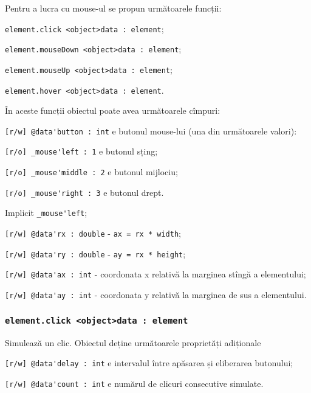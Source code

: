 Pentru a lucra cu mouse-ul se propun următoarele funcții:
\begin{icItems}
	\item \lstinline|element.click <object>data : element|;
	\item \lstinline|element.mouseDown <object>data : element|;
	\item \lstinline|element.mouseUp <object>data : element|;
	\item \lstinline|element.hover <object>data : element|.
\end{icItems}

În aceste funcții obiectul  poate avea următoarele cîmpuri:
\begin{icItems}
	\item \lstinline|[r/w] @data'button : int| e butonul mouse-lui (una din următoarele valori):
	\begin{icItems}
		\item \lstinline|[r/o] _mouse'left : 1| e butonul sțing;
		\item \lstinline|[r/o] _mouse'middle : 2| e butonul mijlociu;
		\item \lstinline|[r/o] _mouse'right : 3| e butonul drept.
	\end{icItems}
	Implicit \lstinline|_mouse'left|;
	\item \lstinline|[r/w] @data'rx : double| - \lstinline|ax = rx * width|;
	\item \lstinline|[r/w] @data'ry : double| - \lstinline|ay = rx * height|;
	\item \lstinline|[r/w] @data'ax : int| - coordonata x relativă la marginea stîngă a elementului;
	\item \lstinline|[r/w] @data'ay : int| - coordonata y relativă la marginea de sus a elementului.
\end{icItems}

\subsubsection{\lstinline|element.click <object>data : element|}

Simulează un clic. Obiectul  deține următoarele proprietăți adiționale
\begin{icItems}
	\item \lstinline|[r/w] @data'delay : int| e intervalul între apăsarea și eliberarea butonului;
	\item \lstinline|[r/w] @data'count : int| e numărul de clicuri consecutive simulate.
\end{icItems}

